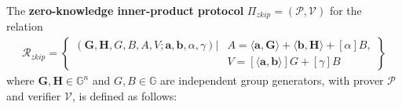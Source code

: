 \documentclass[../lecture-notes-148x210.tex]{subfiles}
\begin{document}
\begin{definition}
    The \textbf{zero-knowledge inner-product protocol} $\Pi_{zkip} = (\mathcal{P,V})$ for the relation 
    \begin{align*}
        \mathcal{R}_{zkip} = \left\{ \begin{aligned} (\mathbf{G,H},G,B,A,V;\mathbf{a,b},\alpha, \gamma) \vert & A = \langle \mathbf{a,G} \rangle + \langle \mathbf{b,H} \rangle + [\alpha] B, \\ & V = [\langle \mathbf{a,b} \rangle]G + [\gamma]B \end{aligned} \right\}
    \end{align*} 
    where $\mathbf{G,H} \in \mathbb{G}^n$ and $G,B \in \mathbb{G}$ are independent group generators, with prover $\mathcal{P}$ and verifier $\mathcal{V}$, is defined as follows:


\end{definition}
\end{document}
